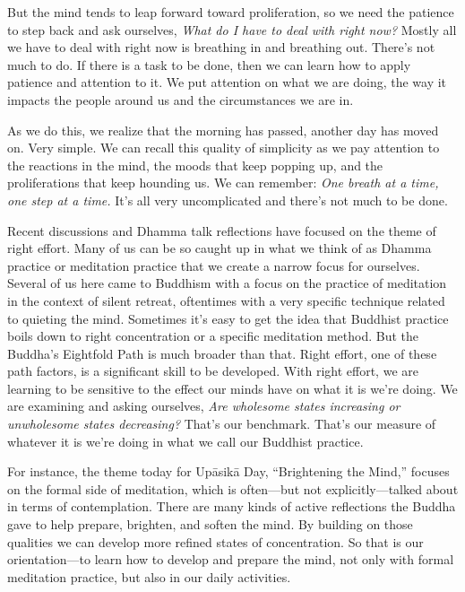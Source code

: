 But the mind tends to leap forward toward proliferation, so we need the 
patience to step back and ask ourselves, \emph{What do I have to deal 
with right now?} Mostly all we have to deal with right now is breathing 
in and breathing out. There's not much to do. If there is a task to be 
done, then we can learn how to apply patience and attention to it. We 
put attention on what we are doing, the way it impacts the people 
around us and the circumstances we are in.

As we do this, we realize that the morning has passed, another day has 
moved on. Very simple. We can recall this quality of simplicity as we 
pay attention to the reactions in the mind, the moods that keep popping 
up, and the proliferations that keep hounding us. We can remember: 
\emph{One breath at a time, one step at a time.} It's all very 
uncomplicated and there's not much to be done.


Recent discussions and Dhamma talk reflections have focused on the 
theme of right effort. Many of us can be so caught up in what we think 
of as Dhamma practice or meditation practice that we create a narrow 
focus for ourselves. Several of us here came to Buddhism with a focus 
on the practice of meditation in the context of silent retreat, 
oftentimes with a very specific technique related to quieting the mind. 
Sometimes it's easy to get the idea that Buddhist practice boils down 
to right concentration or a specific meditation method. But the 
Buddha's Eightfold Path is much broader than that. Right effort, one of 
these path factors, is a significant skill to be developed. With right 
effort, we are learning to be sensitive to the effect our minds have on 
what it is we're doing. We are examining and asking ourselves, 
\emph{Are wholesome states increasing or unwholesome states 
decreasing?} That's our benchmark. That's our measure of whatever it is 
we're doing in what we call our Buddhist practice.

For instance, the theme today for Upāsikā Day, ``Brightening the Mind,''
focuses on the formal side of meditation, which is often---but not
explicitly---talked about in terms of contemplation. There are many
kinds of active reflections the Buddha gave to help prepare, brighten,
and soften the mind. By building on those qualities we can develop more
refined states of concentration. So that is our orientation---to learn
how to \mbox{develop} and prepare the mind, not only with formal
meditation practice, but also in our daily activities.

